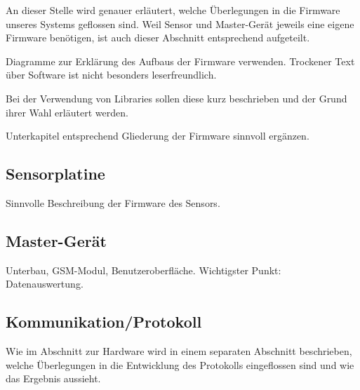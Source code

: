 An  dieser  Stelle wird  genauer  erl\"autert,  welche \"Uberlegungen  in  die
Firmware  unseres  Systems  geflossen  sind. Weil  Sensor  und  Master-Ger\"at
jeweils  eine   eigene  Firmware   ben\"otigen,  ist  auch   dieser  Abschnitt
entsprechend aufgeteilt.

\anweisung   Diagramme    zur   Erkl\"arung    des   Aufbaus    der   Firmware
verwenden. Trockener    Text    \"uber    Software   ist    nicht    besonders
leserfreundlich.

\anweisung Bei der Verwendung von  Libraries sollen diese kurz beschrieben und
der Grund ihrer Wahl erl\"autert werden.

\anweisung   Unterkapitel  entsprechend   Gliederung  der   Firmware  sinnvoll
erg\"anzen.

\subsection{Sensorplatine}
\label{subsec:fw:sensorplatine}

Sinnvolle Beschreibung der Firmware des Sensors.


\subsection{Master-Ger\"at}
\label{subsec:fw:mastergerat}

Unterbau, GSM-Modul, Benutzeroberfl\"ache. Wichtigster Punkt: Datenauswertung.


\subsection{Kommunikation/Protokoll}
\label{subsec:fw:sensorplatine}

Wie im Abschnitt  zur Hardware wird in einem  separaten Abschnitt beschrieben,
welche \"Uberlegungen in die Entwicklung  des Protokolls eingeflossen sind und
wie das Ergebnis aussieht.
